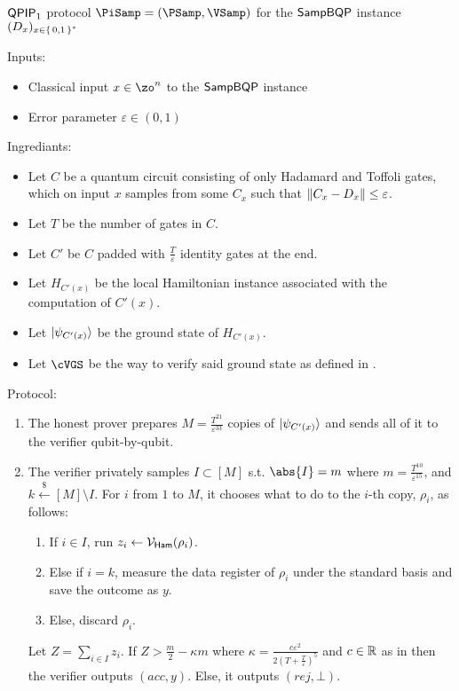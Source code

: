 \begin{protocol}{$\operatorname{\mathsf{QPIP}}_1$ protocol $\PiSamp=(\PSamp, \VSamp)$ for the $\operatorname{\mathsf{SampBQP}}$ instance $(D_x)_{x\in\set{0, 1}^*}$}
	\label{ProtoQPIP1}

	Inputs: 
	\begin{itemize}
		\item Classical input $x\in\zo^n$ to the $\operatorname{\mathsf{SampBQP}}$ instance
		\item Error parameter $\varepsilon\in(0, 1)$
	\end{itemize}

	Ingrediants:
	\begin{itemize}
		\item Let $C$ be a quantum circuit consisting of only Hadamard and Toffoli gates, which on input $x$ samples from some $C_x$ such that $\left\lVert C_x-D_x\right\rVert\leq\varepsilon$.
		\item Let $T$ be the number of gates in $C$.
		\item Let $C'$ be $C$ padded with $\frac{T}{\varepsilon}$ identity gates at the end.
		\item Let $H_{C'(x)}$ be the local Hamiltonian instance associated with the computation of $C'(x)$.
		\item Let $\ket{\psi_{C'(x)}}$ be the ground state of $H_{C'(x)}$.
		\item Let $\cVGS$ be the way to verify said ground state as defined in . 
	\end{itemize}

	Protocol:
	\begin{enumerate}
		\item\label{step:qpip1-state-gen} The honest prover prepares $M=\frac{T^{21}}{\varepsilon^{33}}$ copies of $\ket{\psi_{C'(x)}}$ and sends all of it to the verifier qubit-by-qubit.
		\item\label{step:qpip1-verify} The verifier privately samples $I\subset[M]$ s.t. $\abs{I}=m$ where $m=\frac{T^{10}}{\varepsilon^{15}}$, and $k\xleftarrow{\$}[M]\setminus I$. 
			For $i$ from $1$ to $M$, it chooses what to do to the $i$-th copy, $\rho_i$, as follows:
		\begin{enumerate}
			\item If $i\in I$, run $z_i\leftarrow\mathcal{V}_{\mathsf{Ham}}(\rho_i)$.
			\item Else if $i=k$, measure the data register  of $\rho_i$ under the standard basis and save the outcome as $y$.
			\item Else, discard $\rho_i$.
		\end{enumerate}
			Let $Z=\sum_{i\in I} z_i$. If $Z>\frac{m}{2}-\kappa m$ where $\kappa=\frac{c\varepsilon^2}{2\left(T+\frac{T}{\varepsilon}\right)^5}$ and $c\in\mathbb{R}$ as in  then the verifier outputs $(acc, y)$. Else, it outputs $(rej, \bot)$.
	\end{enumerate}
\end{protocol}

